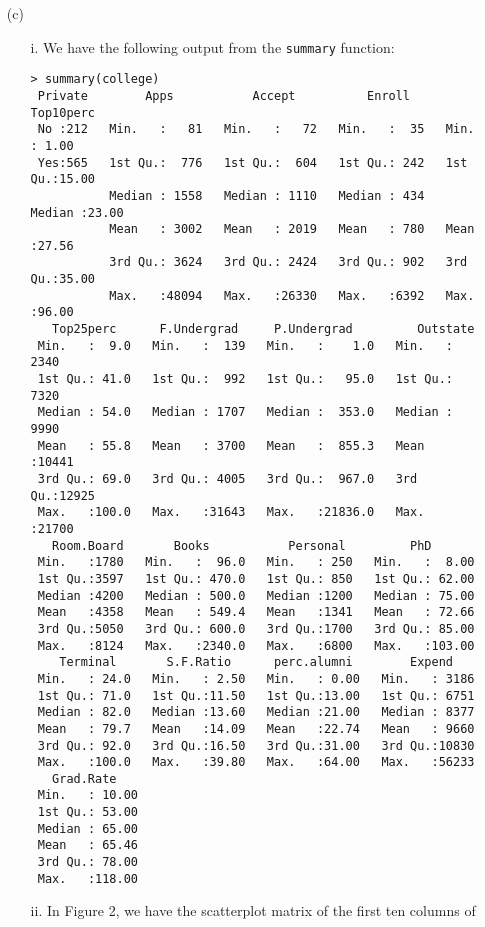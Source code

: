 
\begin{itemize}
    \item[(c)]
    \begin{itemize}
        \item[i.] We have the following output from the \verb|summary| function:
        \begin{verbatim}
> summary(college)
 Private        Apps           Accept          Enroll       Top10perc    
 No :212   Min.   :   81   Min.   :   72   Min.   :  35   Min.   : 1.00  
 Yes:565   1st Qu.:  776   1st Qu.:  604   1st Qu.: 242   1st Qu.:15.00  
           Median : 1558   Median : 1110   Median : 434   Median :23.00  
           Mean   : 3002   Mean   : 2019   Mean   : 780   Mean   :27.56  
           3rd Qu.: 3624   3rd Qu.: 2424   3rd Qu.: 902   3rd Qu.:35.00  
           Max.   :48094   Max.   :26330   Max.   :6392   Max.   :96.00  
   Top25perc      F.Undergrad     P.Undergrad         Outstate    
 Min.   :  9.0   Min.   :  139   Min.   :    1.0   Min.   : 2340  
 1st Qu.: 41.0   1st Qu.:  992   1st Qu.:   95.0   1st Qu.: 7320  
 Median : 54.0   Median : 1707   Median :  353.0   Median : 9990  
 Mean   : 55.8   Mean   : 3700   Mean   :  855.3   Mean   :10441  
 3rd Qu.: 69.0   3rd Qu.: 4005   3rd Qu.:  967.0   3rd Qu.:12925  
 Max.   :100.0   Max.   :31643   Max.   :21836.0   Max.   :21700  
   Room.Board       Books           Personal         PhD        
 Min.   :1780   Min.   :  96.0   Min.   : 250   Min.   :  8.00  
 1st Qu.:3597   1st Qu.: 470.0   1st Qu.: 850   1st Qu.: 62.00  
 Median :4200   Median : 500.0   Median :1200   Median : 75.00  
 Mean   :4358   Mean   : 549.4   Mean   :1341   Mean   : 72.66  
 3rd Qu.:5050   3rd Qu.: 600.0   3rd Qu.:1700   3rd Qu.: 85.00  
 Max.   :8124   Max.   :2340.0   Max.   :6800   Max.   :103.00  
    Terminal       S.F.Ratio      perc.alumni        Expend     
 Min.   : 24.0   Min.   : 2.50   Min.   : 0.00   Min.   : 3186  
 1st Qu.: 71.0   1st Qu.:11.50   1st Qu.:13.00   1st Qu.: 6751  
 Median : 82.0   Median :13.60   Median :21.00   Median : 8377  
 Mean   : 79.7   Mean   :14.09   Mean   :22.74   Mean   : 9660  
 3rd Qu.: 92.0   3rd Qu.:16.50   3rd Qu.:31.00   3rd Qu.:10830  
 Max.   :100.0   Max.   :39.80   Max.   :64.00   Max.   :56233  
   Grad.Rate     
 Min.   : 10.00  
 1st Qu.: 53.00  
 Median : 65.00  
 Mean   : 65.46  
 3rd Qu.: 78.00  
 Max.   :118.00 
        \end{verbatim}
        \item[ii.] In Figure 2, we have the scatterplot matrix of the first ten columns of 

\end{itemize}
\end{itemize}
